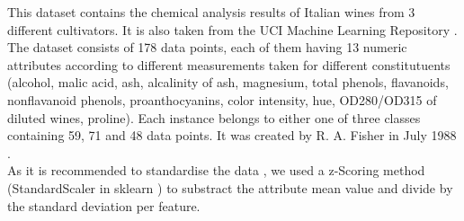 
This dataset contains the chemical analysis results of Italian wines from 3 different cultivators. It is also taken from the UCI Machine Learning Repository \cite{Dua2019}. 
The dataset consists of 178 data points, each of them having 13 numeric attributes according to different measurements taken for different constitutuents (alcohol, malic acid, ash, alcalinity of ash, magnesium, total phenols, flavanoids, nonflavanoid phenols, proanthocyanins, color intensity, hue, OD280/OD315 of diluted wines, proline). Each instance belongs to either one of three classes containing 59, 71 and 48 data points. 
It was created by R. A. Fisher in July 1988 \cite{scikitlearn}.\\ 
As it is recommended to standardise the data \cite{Dua2019}, we used a z-Scoring method (StandardScaler in sklearn \cite{scikitlearn}) to substract the attribute mean value and divide by the standard deviation per feature. 